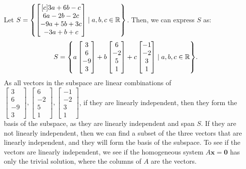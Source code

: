 \documentclass[11pt]{scrartcl}
\theoremstyle{dotlessP}
\theoremstyle{dotlessN}
\DeclarePairedDelimiter\set{\{}{\}}
\newcommand{\reals}{\mathbb{R}} %
\begin{document}
Let $S =		\set*{
			\begin{bmatrix}[c]
			3a + 6b - c \\
			6a - 2b - 2c \\
			-9a + 5b + 3c \\
			-3a + b + c 
		\end{bmatrix} \mid
		a,b,c \in \reals
		}$. Then, we can express $S$ as: 
\[
		S = 
		\set*{
		a 
		\begin{bmatrix}
			3 \\
			6 \\
			-9 \\
			3
		\end{bmatrix} + 
		b
		\begin{bmatrix}
			6 \\ 
			-2 \\
			5 \\
			1
		\end{bmatrix} +
		c
		\begin{bmatrix}
			-1 \\
			-2 \\
			3 \\
			1
		\end{bmatrix} \mid
		a,b,c \in \reals
		}.
\] 
As all vectors in the subspace are linear combinations of $
\begin{bmatrix}
	3 \\
	6 \\
	-9 \\
	3
\end{bmatrix},
\begin{bmatrix}
	6 \\
	-2 \\
	5 \\
	1
\end{bmatrix},
\begin{bmatrix}
	-1 \\
	-2 \\
	3 \\
	1
\end{bmatrix}
$, if they are linearly independent, then they form the basis of the subspace, as they are linearly independent and span $S$. If they are not linearly independent, then we can find a subset of the three vectors that are linearly independent, and they will form the basis of the subspace. To see if the vectors are linearly independent, we see if the homogeneous system $A\bm{x} = \bm{0}$ has only the trivial solution, where the columns of $A$ are the vectors.
\end{document}
